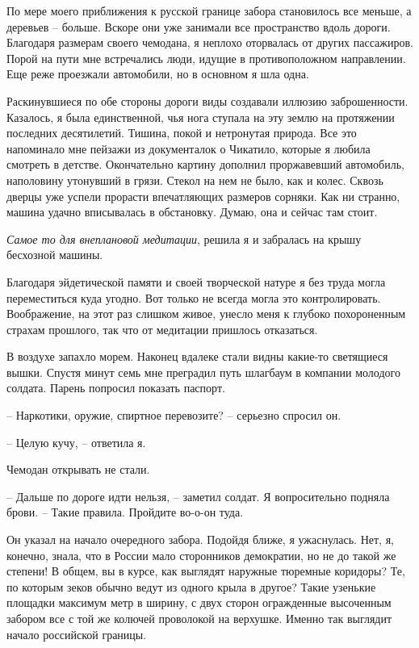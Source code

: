 \documentclass[
]{book}
\begin{document}
По мере моего приближения к русской границе забора становилось все меньше, а деревьев -- больше. Вскоре они уже занимали все пространство вдоль дороги. Благодаря размерам своего чемодана, я неплохо оторвалась от других пассажиров. Порой на пути мне встречались люди, идущие в противоположном направлении. Еще реже проезжали автомобили, но в основном я шла одна.

Раскинувшиеся по обе стороны дороги виды создавали иллюзию заброшенности. Казалось, я была единственной, чья нога ступала на эту землю на протяжении последних десятилетий. Тишина, покой и нетронутая природа. Все это напоминало мне пейзажи из документалок о Чикатило, которые я любила смотреть в детстве. Окончательно картину дополнил проржавевший автомобиль, наполовину утонувший в грязи. Стекол на нем не было, как и колес. Сквозь дверцы уже успели прорасти впечатляющих размеров сорняки. Как ни странно, машина удачно вписывалась в обстановку. Думаю, она и сейчас там стоит.

\emph{Самое то для внеплановой медитации}, решила я и забралась на крышу бесхозной машины.

Благодаря эйдетической памяти и своей творческой натуре я без труда могла переместиться куда угодно. Вот только не всегда могла это контролировать. Воображение, на этот раз слишком живое, унесло меня к глубоко похороненным страхам прошлого, так что от медитации пришлось отказаться.

В воздухе запахло морем. Наконец вдалеке стали видны какие-то светящиеся вышки. Спустя минут семь мне преградил путь шлагбаум в компании молодого солдата. Парень попросил показать паспорт.

-- Наркотики, оружие, спиртное перевозите? -- серьезно спросил он.

-- Целую кучу, -- ответила я.

Чемодан открывать не стали.

-- Дальше по дороге идти нельзя, -- заметил солдат. Я вопросительно подняла брови. -- Такие правила. Пройдите во-о-он туда.

Он указал на начало очередного забора. Подойдя ближе, я ужаснулась. Нет, я, конечно, знала, что в России мало сторонников демократии, но не до такой же степени! В общем, вы в курсе, как выглядят наружные тюремные коридоры? Те, по которым зеков обычно ведут из одного крыла в другое? Такие узенькие площадки максимум метр в ширину, с двух сторон огражденные высоченным забором все с той же колючей проволокой на верхушке. Именно так выглядит начало российской границы.
\end{document}
